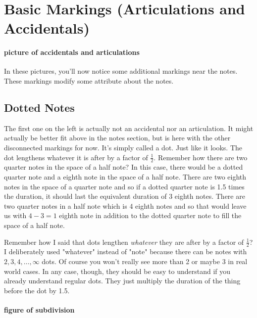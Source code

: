 \documentclass[../OpenAppliedMusicTheory.tex]{subfiles}
\begin{document}
    \section{Basic Markings (Articulations and Accidentals)}\label{ch1:markings}
        \paragraph{picture of accidentals and articulations}

        In these pictures, you'll now notice some additional markings near the notes. These markings modify some attribute about the notes. 
        
        \subsection{Dotted Notes}
        The first one on the left is actually not an accidental nor an articulation. It might actually be better fit above in the notes section, but is here with the other disconnected markings for now. It's simply called a dot. Just like it looks. The dot lengthens whatever it is after by a factor of $\frac{1}{2}$. Remember how there are two quarter notes in the space of a half note? %
        In this case, there would be a dotted quarter note and a eighth note in the space of a half note. There are two eighth notes in the space of a quarter note and so if a dotted quarter note is 1.5 times the duration, it should last the equivalent duration of 3 eighth notes. There are two quarter notes in a half note which is 4 eighth notes and so that would leave us with $4-3=1$ eighth note in addition to the dotted quarter note to fill the space of a half note.

        Remember how I said that dots lengthen \emph{whatever} they are after by a factor of $\frac{1}{2}$? I deliberately used "whatever" instead of "note" because there can be notes with $2, 3, 4, \dots, \infty$ dots. Of course you won't really see more than 2 or maybe 3 in real world cases. In any case, though, they should be easy to understand if you already understand regular dots. They just multiply the duration of the thing before the dot by 1.5. 
        
        \paragraph{figure of subdivision} %
\end{document}
